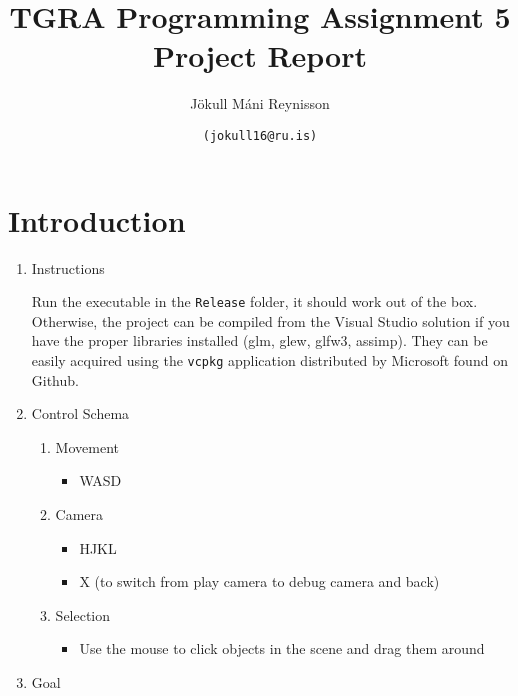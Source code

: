 \documentclass[11pt]{article}
\author{Jökull Máni Reynisson}
\date{\texttt{(jokull16@ru.is)}}
\title{TGRA Programming Assignment 5 Project Report}
\begin{document}
\maketitle

\section{Introduction}
\label{sec:org2bdd7a7}

\begin{enumerate}
\item Instructions
\label{sec:orga072eb3}

Run the executable in the \texttt{Release} folder, it should work out of the box. Otherwise, the project can be compiled from the Visual Studio solution if you have the proper libraries installed (glm, glew, glfw3, assimp). They can be easily acquired using the \texttt{vcpkg} application distributed by Microsoft found on Github.

\item Control Schema
\label{sec:org2a30d03}
\begin{enumerate}
\item Movement
\label{sec:org8b9665f}
\begin{itemize}
\item WASD
\end{itemize}
\item Camera
\label{sec:org27b3a11}
\begin{itemize}
\item HJKL
\item X (to switch from play camera to debug camera and back)
\end{itemize}
\item Selection
\label{sec:orgc2f7c95}
\begin{itemize}
\item Use the mouse to click objects in the scene and drag them around
\end{itemize}
\end{enumerate}

\item Goal
\label{sec:org56f14fe}


\end{enumerate}
\end{document}
